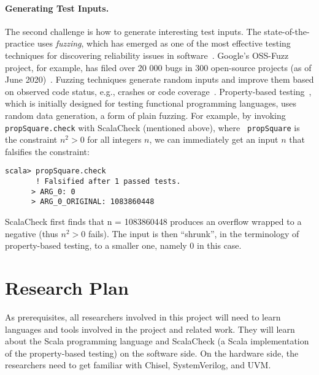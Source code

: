 \documentclass[fleqn,12pt]{article}
\begin{document}
\paragraph{Generating Test Inputs.}
The second challenge is how to generate interesting test inputs.  The
state-of-the-practice uses \emph{fuzzing}, which has emerged as one of
the most effective testing techniques for discovering reliability
issues in software~\cite{takanen2018fuzzing}.  Google's OSS-Fuzz
project, for example, has filed over 20 000 bugs in 300 open-source
projects (as of June 2020)~\cite{web:oss-fuzz}.  Fuzzing techniques
generate random inputs and improve them based on observed code status,
e.g., crashes or code
coverage~\cite{DBLP:journals/tse/BohmePR19,DBLP:conf/pldi/FuS17}.
Property-based testing~\cite{DBLP:conf/icfp/ClaessenH00}, which is
initially designed for testing functional programming languages, uses
random data generation, a form of plain fuzzing. For example, by
invoking {\tt propSquare.check} with ScalaCheck (mentioned above), where {\tt
  propSquare} is the constraint $n^2>0$ for all integers $n$, we can
immediately get an input $n$ that falsifies the constraint:

\begin{lstlisting}[numbers=none]
scala> propSquare.check
       ! Falsified after 1 passed tests.
      > ARG_0: 0
      > ARG_0_ORIGINAL: 1083860448
\end{lstlisting}
 ScalaCheck first finds that n = 1083860448 produces an overflow
 wrapped to a negative (thus $n^2>0$ fails). The input is then
 ``shrunk'', in the terminology of property-based testing, to a smaller
 one, namely 0 in this case.







\section{Research Plan}


As prerequisites, all researchers involved in this project will need to learn
languages and tools involved in the project and related work.
They will learn about the Scala programming language and ScalaCheck
(a Scala implementation of the property-based testing) on the software side.
On the hardware side,
the researchers need to get familiar with Chisel, SystemVerilog, and
UVM.
\end{document}
